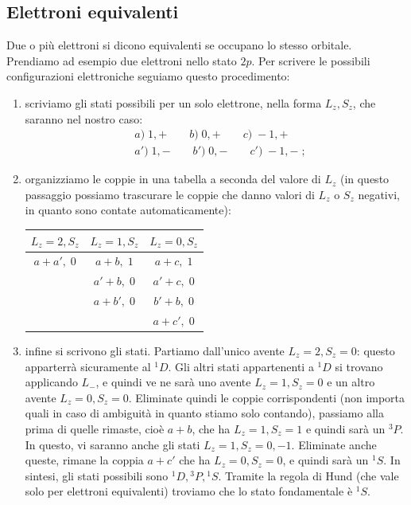 \documentclass[12pt,a4paper]{report}
\theoremstyle{definition}
\numberwithin{equation}{section}
\begin{document}
\subsection*{Elettroni equivalenti}
Due o più elettroni si dicono equivalenti se occupano lo stesso orbitale. Prendiamo ad esempio due elettroni nello stato $2p$. Per scrivere le possibili configurazioni elettroniche seguiamo questo procedimento:
\begin{enumerate}
\item scriviamo gli stati possibili per un solo elettrone, nella forma $L_z,S_z$, che saranno nel nostro caso:
\begin{align*}
&a)\; 1,+\qquad b)\; 0,+\qquad c)\; -1,+ \\
&a')\; 1,-\qquad b')\; 0,-\qquad c')\; -1,-\;;
\end{align*}
\item organizziamo le coppie in una tabella a seconda del valore di $L_z$ (in questo passaggio possiamo trascurare le coppie che danno valori di $L_z$ o $S_z$ negativi, in quanto sono contate automaticamente):

\begin{table}[h]
\centering
\begin{tabular}{c|c|c}
\toprule
\multicolumn{1}{c|}{$L_z=2,S_z$} &
\multicolumn{1}{c|}{$L_z=1,S_z$} &
\multicolumn{1}{c}{$L_z=0,S_z$} \\
\midrule
$a+a',\;0$ & $a+b,\; 1$ & $a+c,\; 1$ \\
{} & $a'+b,\; 0$ & $a'+c,\;0$ \\
{} & $a+b', \;0$ & $b'+b, \;0$ \\
{} & {} & $a+c',\; 0$ \\
\bottomrule

\end{tabular}

\end{table}
\item infine si scrivono gli stati. Partiamo dall'unico avente $L_z=2, S_z=0$: questo apparterrà sicuramente al ${}^1D$. Gli altri stati appartenenti a ${}^1D$ si trovano applicando $L_-$, e quindi ve ne sarà uno avente $L_z=1,S_z=0$ e un altro avente $L_z=0,S_z=0$. Eliminate quindi le coppie corrispondenti (non importa quali in caso di ambiguità in quanto stiamo solo contando), passiamo alla prima di quelle rimaste, cioè $a+b$, che ha $L_z=1,S_z=1$ e quindi sarà un ${}^3P$. In questo, vi saranno anche gli stati $L_z=1,S_z=0,-1$. Eliminate anche queste, rimane la coppia $a+c'$ che ha $L_z=0,S_z=0$, e quindi sarà un ${}^1S$. In sintesi, gli stati possibili sono ${}^1D,{}^3P,{}^1S$. Tramite la regola di Hund (che vale solo per elettroni equivalenti) troviamo che lo stato fondamentale è ${}^1S$.
\end{enumerate}
\end{document}

